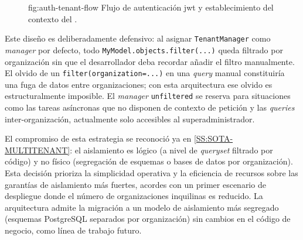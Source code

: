 \begin{figure}[Flujo de autenticación y contexto multi-tenant]%
              {fig:auth-tenant-flow}%
              {Flujo de autenticación \acs{jwt} y establecimiento del
               contexto del .}
\end{figure}

Este diseño es deliberadamente defensivo: al asignar
\texttt{TenantManager} como \textit{manager} por defecto, todo
\texttt{MyModel.objects.filter(...)} queda filtrado por organización
sin que el desarrollador deba recordar añadir el filtro manualmente. El
olvido de un \texttt{filter(organization=...)} en una \textit{query}
manual constituiría una fuga de datos entre organizaciones; con esta
arquitectura ese olvido es estructuralmente imposible. El
\textit{manager} \texttt{unfiltered} se reserva para situaciones como
las tareas asíncronas que no disponen de contexto de petición y las
\textit{queries} inter-organización, actualmente solo accesibles al
superadministrador.

El compromiso de esta estrategia se reconoció ya en
\cref{SS:SOTA-MULTITENANT}: el aislamiento es lógico (a nivel de
\textit{queryset} filtrado por código) y no físico (segregación de
esquemas o bases de datos por organización). Esta decisión prioriza la
simplicidad operativa y la eficiencia de recursos sobre las garantías
de aislamiento más fuertes, acordes con un primer escenario de
despliegue donde el número de organizaciones inquilinas es reducido.
La arquitectura admite la migración a un modelo de aislamiento más
segregado (esquemas PostgreSQL separados por organización) sin cambios
en el código de negocio, como línea de trabajo futuro.
